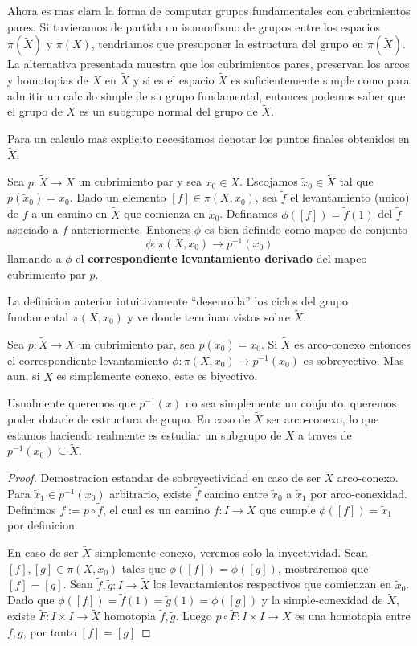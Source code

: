 Ahora es mas clara la forma de computar grupos fundamentales con
cubrimientos pares. Si tuvieramos de partida un isomorfismo de grupos
entre los espacios \(\pi (\tilde X)\) y \(\pi (X)\), tendriamos que
presuponer la estructura del grupo en \(\pi (\tilde X)\). La alternativa
presentada muestra que los cubrimientos pares, preservan los arcos y
homotopias de \(X\) en \(\tilde X\) y si es el espacio \(\tilde X\) es
suficientemente simple como para admitir un calculo simple de su grupo
fundamental, entonces podemos saber que el grupo de \(X\) es un subgrupo
normal del grupo de \(\tilde X\).

Para un calculo mas explicito necesitamos denotar los puntos finales
obtenidos en \(\tilde X\).
\begin{definicion}
  Sea \(p : \tilde X \to X\) un cubrimiento par y sea \(x_0 \in X\).
  Escojamos \(\tilde x _0 \in \tilde X\) tal que \(p(\tilde x _0) =
  x_0\). Dado un elemento \([f] \in \pi (X, x_0)\), sea \(\tilde f\) el
  levantamiento (unico) de \(f\) a un camino en \(\tilde X\) que
  comienza en \(\tilde x _0\). Definamos \(\phi ([f]) = \tilde f (1)\) del
  \(\tilde f\) asociado a \(f\) anteriormente. Entonces \(\phi\) es bien
  definido como mapeo de conjunto
  \[ \phi : \pi (X, x_0) \longrightarrow p^{-1} (x_0)\]
  llamando a \(\phi\) el \textbf{correspondiente levantamiento derivado}
  del mapeo cubrimiento par \(p\).
\end{definicion}
La definicion anterior intuitivamente ``desenrolla'' los ciclos del
grupo fundamental \(\pi (X,x_0)\) y ve donde terminan vistos sobre
\(\tilde X\).
\begin{teorema}
  Sea \(p : \tilde X \to X\) un cubrimiento par, sea \(p (\tilde x _0) =
  x_0\). Si \(\tilde X\) es arco-conexo entonces el correspondiente
  levantamiento \(\phi : \pi (X, x _0) \to p^{-1} (x_0)\) es
  sobreyectivo. Mas aun, si \(\tilde X\) es simplemente conexo, este es
  biyectivo.
\end{teorema}
Usualmente queremos que \(p^{-1} (x)\) no sea simplemente un conjunto,
queremos poder dotarle de estructura de grupo. En caso de \(\tilde X\)
ser arco-conexo, lo que estamos haciendo realmente es estudiar un
subgrupo de \(X\) a traves de \(p^{-1}(x_0) \subseteq \tilde X\).
\begin{proof}
  Demostracion estandar de sobreyectividad en caso de ser \(\tilde X\)
  arco-conexo. Para \(\tilde x _1 \in p^{-1} (x_0)\) arbitrario, existe
  \(\tilde f\) camino entre \(\tilde x _0 \) a \(\tilde x _1\) por
  arco-conexidad. Definimos \(f := p \circ \tilde f\), el cual es un
  camino \(f : I \to X\) que cumple \(\phi ([f]) = \tilde x _1\) por
  definicion.

  En caso de ser \(\tilde X\) simplemente-conexo, veremos solo la
  inyectividad. Sean \([f],[g] \in \pi (X, x_0)\) tales que \(\phi([f])
  = \phi([g])\), mostraremos que \([f] = [g]\). Sean \(\tilde f, \tilde
  g : I \to \tilde X\) los levantamientos respectivos que comienzan en
  \(\tilde x _0\). Dado que \(\phi([f]) = \tilde f (1) = \tilde g (1) =
  \phi([g])\) y la simple-conexidad de \(\tilde X\), existe \(\tilde F :
  I \times I \to \tilde X\) homotopia \(\tilde f, \tilde g\). Luego \(p
  \circ \tilde F : I \times I \to X \) es una homotopia entre \(f, g\),
  por tanto \([f] = [g]\)
\end{proof}
